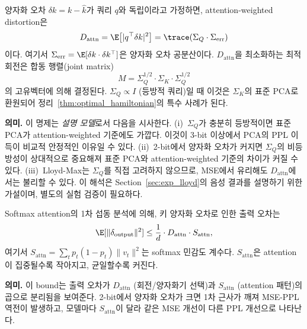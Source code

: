 \begin{proposition}
\label{prop:attn_weighted}
양자화 오차 $\delta k = k - \hat{k}$가 쿼리 $q$와 독립이라고 가정하면, attention-weighted distortion은
\begin{equation}
D_{\mathrm{attn}} = \E\bigl[\lvert q^\top \delta k \rvert^2\bigr] = \trace(\Sigma_Q \cdot \Sigma_{\mathrm{err}})
\end{equation}
이다. 여기서 $\Sigma_{\mathrm{err}} = \E[\delta k \cdot \delta k^\top]$은 양자화 오차 공분산이다. $D_{\mathrm{attn}}$을 최소화하는 최적 회전은 합동 행렬(joint matrix)
\begin{equation}
M = \Sigma_Q^{1/2} \cdot \Sigma_K \cdot \Sigma_Q^{1/2}
\end{equation}
의 고유벡터에 의해 결정된다. $\Sigma_Q \propto I$ (등방적 쿼리)일 때 이것은 $\Sigma_K$의 표준 PCA로 환원되어 정리~\ref{thm:optimal_hamiltonian}의 특수 사례가 된다.
\end{proposition}

\begin{theorycomment}
\textbf{의미.} 이 명제는 \emph{설명 모델}로서 다음을 시사한다. (i)~$\Sigma_Q$가 충분히 등방적이면 표준 PCA가 attention-weighted 기준에도 가깝다. 이것이 3-bit 이상에서 PCA의 PPL 이득이 비교적 안정적인 이유일 수 있다. (ii)~2-bit에서 양자화 오차가 커지면 $\Sigma_Q$의 비등방성이 상대적으로 중요해져 표준 PCA와 attention-weighted 기준의 차이가 커질 수 있다. (iii)~Lloyd-Max는 $\Sigma_Q$를 직접 고려하지 않으므로, MSE에서 유리해도 $D_{\mathrm{attn}}$에서는 불리할 수 있다. 이 해석은 Section~\ref{sec:exp_lloyd}의 음성 결과를 설명하기 위한 가설이며, 별도의 실험 검증이 필요하다.
\end{theorycomment}

\begin{proposition}
\label{prop:attn_error_bound}
Softmax attention의 1차 섭동 분석에 의해, 키 양자화 오차로 인한 출력 오차는
\begin{equation}
\E[\lVert \delta_{\mathrm{output}} \rVert^2] \leq \frac{1}{d} \cdot D_{\mathrm{attn}} \cdot S_{\mathrm{attn}},
\end{equation}
여기서 $S_{\mathrm{attn}} = \sum_t p_t(1-p_t) \lVert v_t \rVert^2$는 softmax 민감도 계수다. $S_{\mathrm{attn}}$은 attention이 집중될수록 작아지고, 균일할수록 커진다.
\end{proposition}

\begin{theorycomment}
\textbf{의미.} 이 bound는 출력 오차가 $D_{\mathrm{attn}}$ (회전/양자화기 선택)과 $S_{\mathrm{attn}}$ (attention 패턴)의 곱으로 분리됨을 보여준다. 2-bit에서 양자화 오차가 크면 1차 근사가 깨져 MSE-PPL 역전이 발생하고, 모델마다 $S_{\mathrm{attn}}$이 달라 같은 MSE 개선이 다른 PPL 개선으로 나타난다.
\end{theorycomment}


